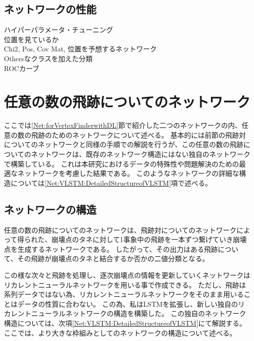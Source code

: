 \subsection{ネットワークの性能} \label{Net:PM:PerformanceofPM}

ハイパーパラメータ・チューニング\\

位置を見ているか\\
Chi2, Pos, Cov Mat, 位置を予想するネットワーク\\

Othersなクラスを加えた分類\\

ROCカーブ\\


\section{任意の数の飛跡についてのネットワーク} \label{Net:VertexLSTM}

ここでは\ref{Net:forVertexFinderwithDL}節で紹介した二つのネットワークの内、任意の数の飛跡のためのネットワークについて述べる。
基本的には前節の飛跡対についてのネットワークと同様の手順での解説を行うが、この任意の数の飛跡についてのネットワークは、既存のネットワーク構造にはない独自のネットワークで構築している。
これは本研究におけるデータの特殊性や問題解決のための最適なネットワークを考慮した結果である。
このようなネットワークの詳細な構造については\ref{Net:VLSTM:DetailedStructureofVLSTM}項で述べる。


\subsection{ネットワークの構造} \label{Net:VLSTM:StructureofVLSTM}

任意の数の飛跡についてのネットワークは、飛跡対についてのネットワークによって得られた、崩壊点のタネに対して1事象中の飛跡を一本ずつ繋げていき崩壊点を生成するネットワークである。
したがって、その出力はある飛跡について、その飛跡が崩壊点のタネと結合するか否かの二値分類となる。

この様な次々と飛跡を処理し、逐次崩壊点の情報を更新していくネットワークはリカレントニューラルネットワークを用いる事で作成できる。
ただし、飛跡は系列データではない為、リカレントニューラルネットワークをそのまま用いることはデータの性質に合わない。
この為、私はLSTMを拡張し、新しい独自のリカレントニューラルネットワークの構造を構築した。
この独自のネットワーク構造については、次項\ref{Net:VLSTM:DetailedStructureofVLSTM}にて解説する。
ここでは、より大きな枠組みとしてのネットワークの構造について述べる。

